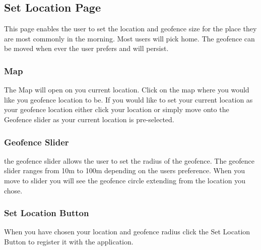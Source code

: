 \documentclass{article}
\begin{document}
\subsection{Set Location Page}
This page enables the user to set the location and geofence size for the place they are most commonly in the morning. Most users will pick home. The geofence can be moved when ever the user prefers and will persist. 
\subsubsection{Map}
The Map will open on you current location. Click on the map where you would like you geofence location to be. If you would like to set your current location as your geofence location either click your location or simply move onto the Geofence slider as your current location is pre-selected.
\subsubsection{Geofence Slider}
the geofence slider allows the user to set the radius of the geofence. The geofence slider ranges from 10m to 100m depending on the users preference. When you move to slider you will see the geofence circle extending from the location you chose.
\subsubsection{Set Location Button}
When you have chosen your location and geofence radius click the Set Location Button to register it with the application.
\end{document}
